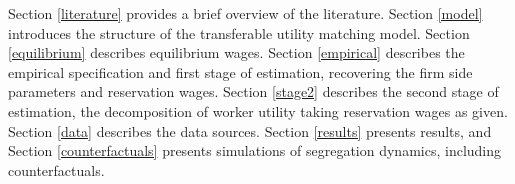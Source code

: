 \documentclass[11pt]{article}
\begin{document}
Section \ref{literature} provides a brief overview of the literature. Section \ref{model} introduces the structure of the transferable utility matching model. Section \ref{equilibrium} describes equilibrium wages. Section \ref{empirical} describes the empirical specification and first stage of estimation, recovering the firm side parameters and reservation wages. Section \ref{stage2} describes the second stage of estimation, the decomposition of worker utility taking reservation wages as given. Section \ref{data} describes the data sources. Section \ref{results} presents results, and Section \ref{counterfactuals} presents simulations of segregation dynamics, including counterfactuals.


\end{document}
